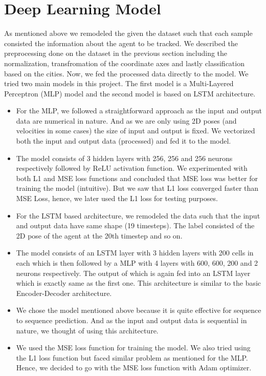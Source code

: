 \documentclass{article}
\begin{document}
\section{Deep Learning Model}
As mentioned above we remodeled the given the dataset such that each sample consisted the information about the agent 
to be tracked. We described the preprocessing done on the dataset in the previous section including the normalization, 
transfromation of the coordinate axes and lastly classification based on the cities. Now, we fed the processed data directly to the model.
We tried two main models in this project. The first model is a Multi-Layered Perceptron (MLP) model and the second model is based on LSTM architecture.
\begin{itemize}
  \item For the MLP, we followed a straightforward approach as the input and output data are numerical in nature. And as 
  we are only using 2D poses (and velocities in some cases) the size of input and output is fixed. We vectorized both the input and output data (processed) and fed it to the model.
  \item The model consists of 3 hidden layers with 256, 256 and 256 neurons respectively followed by ReLU activation function. We experimented with both L1 and MSE loss functions and concluded that
  MSE loss was better for training the model (intuitive). But we saw that L1 loss converged faster than MSE Loss, hence, we later used the L1 loss for testing purposes.
  \item For the LSTM based architecture, we remodeled the data such that the input and output data have same shape (19 timesteps). The label consisted of the 2D pose of the agent at the 20th timestep and so on.
  \item The model consists of an LSTM layer with 3 hidden layers with 200 cells in each which is then followed by a MLP with 4 layers with 600, 600, 200 and 2 neurons respectively. The output
  of which is again fed into an LSTM layer which is exactly same as the first one. This architecture is similar to the basic Encoder-Decoder architecture.
  \item We chose the model mentioned above because it is quite effective for sequence to sequence prediction. And as the input and output data is sequential in nature, we thought of using this architecture.
  \item We used the MSE loss function for training the model. We also tried using the L1 loss function but faced similar problem as mentioned for the MLP. Hence, we decided to go with the MSE loss function with Adam optimizer.

\end{itemize}
\end{document}
